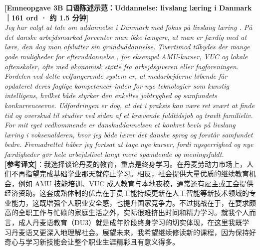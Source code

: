 \begin{transbox}
\small
\textbf{\color{NCDNavy}[Emneopgave 3B 口语陈述示范：Uddannelse: livslang læring i Danmark｜161 ord · 约 1.5 分钟]}\\
\textit{Jeg har valgt at tale om uddannelse i Danmark med fokus på livslang læring . På det danske arbejdsmarked forventer man ikke længere, at man er færdig med at lære, den dag man afslutter sin grunduddannelse. Tværtimod tilbydes der mange gode muligheder for efteruddannelse , for eksempel AMU-kurser, VUC og lokale aftenskoler, ofte med økonomisk støtte fra arbejdsgiveren eller fagforeningen. Fordelen ved dette velfungerende system er, at medarbejderne løbende får opdateret deres faglige kompetencer  inden for nye teknologier som kunstig intelligens, hvilket både styrker den enkeltes jobtryghed og samfundets konkurrenceevne. Udfordringen er dog, at det i praksis kan være ret svært at finde tid og overskud til studier ved siden af et krævende fuldtidsjob og travlt familieliv. For mit eget vedkommende er danskuddannelsen  et konkret bevis på livslang læring i voksenalderen, hvor jeg både lærer det danske sprog og forstår samfundet bedre. Fremadrettet håber jeg fortsat at tage nye kurser, fordi nysgerrighed og nye færdigheder gør hele arbejdslivet langt mere spændende og meningsfuldt.}\\[4pt]
\textbf{\color{NCDTeal}[参考译文]}：我选择谈论丹麦的教育，重点是终身学习。在丹麦劳动力市场上，人们不再指望完成基础学业那天就停止学习。相反，社会提供大量优质的继续教育机会，例如 AMU 技能培训、VUC 成人教育与本地夜校，通常还有雇主或工会提供经济资助。这套成熟体制的优点在于员工能持续更新在人工智能等新技术领域的专业能力，这既增强个人职业安全感，也提升国家竞争力。不过挑战在于，在要求颇高的全职工作与忙碌的家庭生活之外，实际很难挤出时间和精力学习。就我个人而言，成人丹麦语教育（DU3）就是成年阶段终身学习的切实体现，在这里我既学习丹麦语又更深入地理解社会。展望未来，我希望继续修读新的课程，因为保持好奇心与学习新技能会让整个职业生涯精彩且有意义得多。
\end{transbox}

